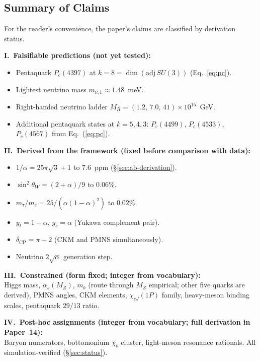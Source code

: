 \documentclass[11pt]{article}
\newcommand{\dcp}{\delta_\text{CP}}
\begin{document}
\subsection*{Summary of Claims}

For the reader's convenience, the paper's claims are classified
by derivation status.

\noindent\textbf{I.\ Falsifiable predictions (not yet tested):}
\begin{itemize}\setlength\itemsep{0pt}
  \item Pentaquark $P_c(4397)$ at $k = 8 = \dim(\mathrm{adj}\,SU(3))$
        (Eq.~\ref{eq:pc}).
  \item Lightest neutrino mass $m_{\nu,1} \approx 1.48$~meV.
  \item Right-handed neutrino ladder $M_{R} = (1.2,\,7.0,\,41)
        \times 10^{15}$~GeV.
  \item Additional pentaquark states at $k = 5, 4, 3$:
        $P_c(4499)$, $P_c(4533)$, $P_c(4567)$ from
        Eq.~(\ref{eq:pc}).
\end{itemize}
\noindent\textbf{II.\ Derived from the framework
  (fixed before comparison with data):}
\begin{itemize}\setlength\itemsep{0pt}
  \item $1/\alpha = 25\pi\sqrt{3}+1$ to $7.6$~ppm
        (\S\ref{sec:ab-derivation}).
  \item $\sin^2\theta_W = (2+\alpha)/9$ to $0.06\%$.
  \item $m_\tau/m_e = 25/(\alpha(1-\alpha)^2)$ to $0.02\%$.
  \item $y_t = 1-\alpha$, $y_c = \alpha$ (Yukawa complement pair).
  \item $\dcp = \pi - 2$ (CKM and PMNS simultaneously).
  \item Neutrino $2\sqrt{\alpha}$ generation step.
\end{itemize}
\noindent\textbf{III.\ Constrained
  (form fixed; integer from vocabulary):}\\
Higgs mass, $\alpha_s(M_Z)$, $m_b$ (route through $M_Z$
empirical; other five quarks are derived), PMNS angles,
CKM elements, $\chi_{cJ}(1P)$ family, heavy-meson binding
scales, pentaquark $29/13$ ratio.

\noindent\textbf{IV.\ Post-hoc assignments
  (integer from vocabulary; full derivation in Paper~14):}\\
Baryon numerators, bottomonium $\chi_b$ cluster,
light-meson resonance rationals.  All simulation-verified
(\S\ref{sec:status}).
\end{document}
